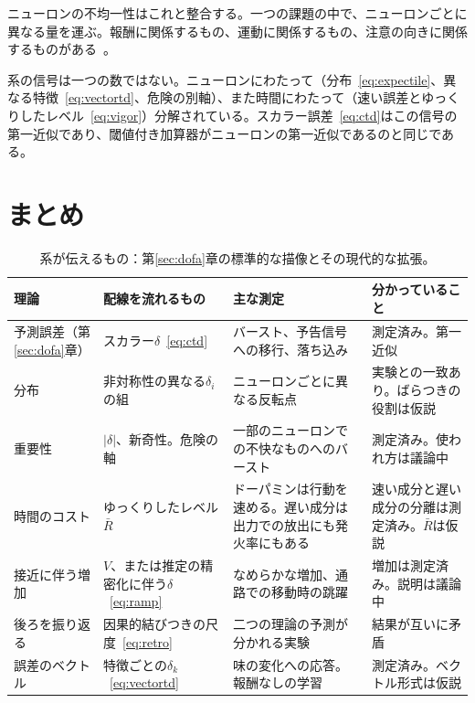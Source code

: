 ニューロンの不均一性はこれと整合する。一つの課題の中で、ニューロンごとに異なる量を運ぶ。報酬に関係するもの、運動に関係するもの、注意の向きに関係するものがある~\cite{Engelhard2019}。

\begin{keyblock}
\begin{proposition}[配線ではなく配線の束]
\label{prop:bundle}
系の信号は一つの数ではない。ニューロンにわたって（分布~\eqref{eq:expectile}、異なる特徴~\eqref{eq:vectortd}、危険の別軸）、また時間にわたって（速い誤差とゆっくりしたレベル~\eqref{eq:vigor}）分解されている。スカラー誤差~\eqref{eq:ctd}はこの信号の第一近似であり、閾値付き加算器がニューロンの第一近似であるのと同じである。
\end{proposition}
\end{keyblock}

\section{まとめ}

\begin{table}[t]
\centering
\footnotesize
\setlength{\tabcolsep}{4pt}
\renewcommand{\arraystretch}{1.15}
\begin{tabular}{>{\raggedright}p{2.5cm}>{\raggedright}p{3.2cm}>{\raggedright}p{3.6cm}>{\raggedright\arraybackslash}p{4.2cm}}
\toprule
理論 & 配線を流れるもの & 主な測定 & 分かっていること \\
\midrule
予測誤差（第\ref{sec:dofa}章） & スカラー$\delta$~\eqref{eq:ctd} & バースト、予告信号への移行、落ち込み & 測定済み。第一近似 \\
分布 & 非対称性の異なる$\delta_i$の組 & ニューロンごとに異なる反転点 & 実験との一致あり。ばらつきの役割は仮説 \\
重要性 & $|\delta|$、新奇性。危険の軸 & 一部のニューロンでの不快なものへのバースト & 測定済み。使われ方は議論中 \\
時間のコスト & ゆっくりしたレベル$\bar R$ & ドーパミンは行動を速める。遅い成分は出力での放出にも発火率にもある & 速い成分と遅い成分の分離は測定済み。$\bar R$は仮説 \\
接近に伴う増加 & $V$、または推定の精密化に伴う$\delta$~\eqref{eq:ramp} & なめらかな増加、通路での移動時の跳躍 & 増加は測定済み。説明は議論中 \\
後ろを振り返る & 因果的結びつきの尺度~\eqref{eq:retro} & 二つの理論の予測が分かれる実験 & 結果が互いに矛盾 \\
誤差のベクトル & 特徴ごとの$\delta_k$~\eqref{eq:vectortd} & 味の変化への応答。報酬なしの学習 & 測定済み。ベクトル形式は仮説 \\
\bottomrule
\end{tabular}
\caption{系が伝えるもの：第\ref{sec:dofa}章の標準的な描像とその現代的な拡張。}
\label{tab:dofaalt}
\end{table}

